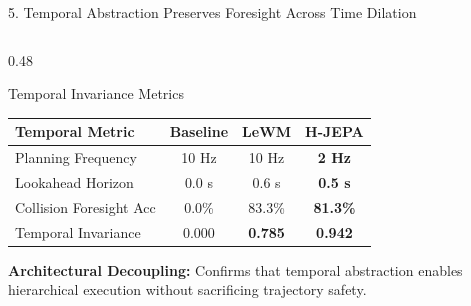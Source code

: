 \documentclass[aspectratio=169, 10pt]{beamer}
\begin{document}
\begin{frame}{5. Temporal Abstraction Preserves Foresight Across Time Dilation}
\begin{columns}[T]
    \begin{column}{0.48\textwidth}
      \begin{block}{Temporal Invariance Metrics}
        \scriptsize
        \centering
        \setlength{\tabcolsep}{3pt}
        \begin{tabular}{lccc}
          \toprule
          \textbf{Temporal Metric} & \textbf{Baseline} & \textbf{LeWM} & \textbf{H-JEPA} \\
          \midrule
          Planning Frequency & 10 Hz & 10 Hz & \textbf{2 Hz} \\
          Lookahead Horizon & 0.0 s & 0.6 s & \textbf{0.5 s} \\
          Collision Foresight Acc & 0.0\% & 83.3\% & \textbf{81.3\%} \\
          Temporal Invariance & \alert{0.000} & \textbf{0.785} & \textbf{0.942} \\
          \bottomrule
        \end{tabular}
      \end{block}
      \vspace{0.05cm}
      \scriptsize \textbf{Architectural Decoupling:} Confirms that temporal abstraction enables hierarchical execution without sacrificing trajectory safety.
    \end{column}
  \end{columns}
\end{frame}
\end{document}
